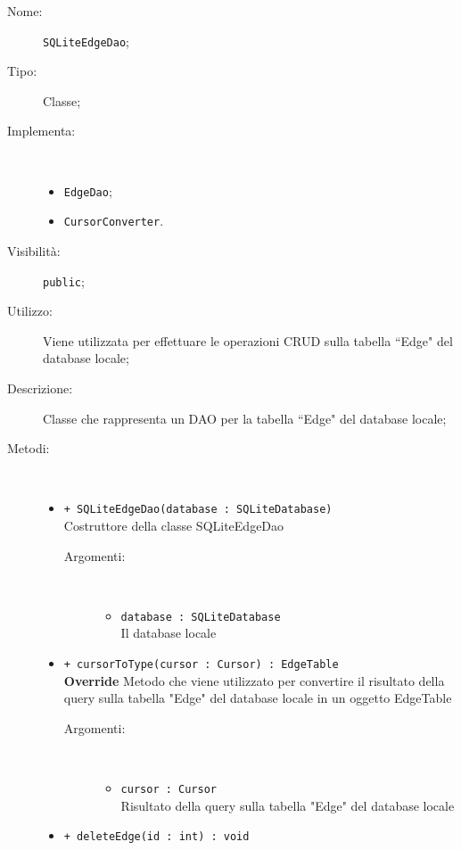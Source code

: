 \documentclass[../DefinizioneDiProdotto.tex]{subfiles}
\begin{document}
\begin{description}
	\item[Nome:] \texttt{SQLiteEdgeDao};
	\item[Tipo:] Classe;
	\item[Implementa:] \
	\begin{itemize}
		\item \texttt{EdgeDao};
		
		\item \texttt{CursorConverter}.
		
	\end{itemize}
	\item[Visibilità:] \texttt{public};
	\item[Utilizzo:] Viene utilizzata per effettuare le operazioni CRUD sulla tabella “Edge" del database locale;
	\item[Descrizione:] Classe che rappresenta un DAO per la tabella “Edge" del database locale;
	\item[Metodi:] \
	\begin{itemize}
		\item \texttt{+ SQLiteEdgeDao(database : SQLiteDatabase)}\\
		Costruttore della classe SQLiteEdgeDao
		\begin{description}
			\item[Argomenti:] \
			\begin{itemize}
				\item \texttt{database : SQLiteDatabase}\\
				Il database locale\end{itemize}
		\end{description}
		\item \texttt{+ cursorToType(cursor : Cursor) : EdgeTable}\\
		\textbf{Override} Metodo che viene utilizzato per convertire il risultato della query sulla tabella "Edge" del database locale in un oggetto EdgeTable
		\begin{description}
			\item[Argomenti:] \
			\begin{itemize}
				\item \texttt{cursor : Cursor}\\
				Risultato della query sulla tabella "Edge" del database locale\end{itemize}
		\end{description}
		\item \texttt{+ deleteEdge(id : int) : void}\\

\end{itemize}
\end{description}
\end{document}

